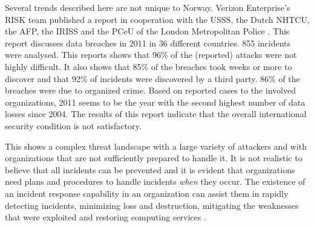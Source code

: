 Several trends described here are not unique to Norway. Verizon Enterprise's RISK team published a report in cooperation with the \ac{USSS}, the Dutch \ac{NHTCU}, the \ac{AFP}, the \ac{IRISS} and the \ac{PCeU} of the London Metropolitan Police \cite{VerizonReport}. This report discusses data breaches in 2011 in 36 different countries. 855 incidents were analysed. This reports shows that 96\% of the (reported) attacks were not highly difficult. It also shows that 85\% of the breaches took weeks or more to discover and that 92\% of incidents were discovered by a third party. 86\% of the breaches were due to organized crime. Based on reported cases to the involved organizations, 2011 seems to be the year with the second highest number of data losses since 2004. The results of this report indicate that the overall international security condition is not satisfactory.

This shows a complex threat landscape with a large variety of attackers and with organizations that are not sufficiently prepared to handle it. It is not realistic to believe that all incidents can be prevented and it is evident that organizations need plans and procedures to handle incidents \textit{when} they occur. The existence of an incident response capability in an organization can assist them in rapidly detecting incidents, minimizing loss and destruction, mitigating the weaknesses that were exploited and restoring computing services \cite{nist800-61}. 

